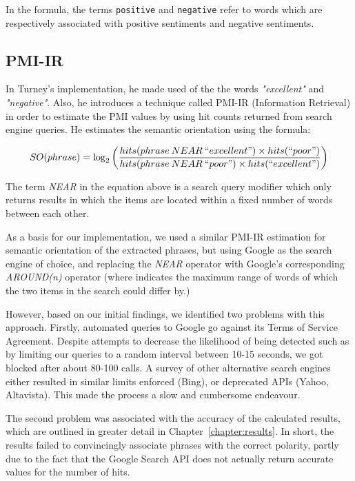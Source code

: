 \documentclass[11pt]{report} %
\begin{document}
In the formula, the terms \verb|positive| and \verb|negative| refer to words which are respectively associated with positive sentiments and negative sentiments. 

\subsection{PMI-IR}
In Turney's implementation, he made used of the the words \textit{"excellent"} and \textit{"negative"}. Also, he introduces a technique called PMI-IR (Information Retrieval) in order to estimate the PMI values by using hit counts returned from search engine queries. He estimates the semantic orientation using the formula:

\begin{equation*} SO(phrase) = \log_2 \left(\frac{hits(phrase \: NEAR \: ``excellent") \times hits(``poor") }{hits(phrase \: NEAR \: ``poor") \times hits(``excellent") }\right) \end{equation*}

The term \textit{NEAR} in the equation above is a search query modifier which only returns results in which the items are located within a fixed number of words between each other. 

As a basis for our implementation, we used a similar PMI-IR estimation for semantic orientation of the extracted phrases, but using Google as the search engine of choice, and replacing the \textit{NEAR} operator with Google's corresponding \textit{AROUND(n)} operator (where  indicates the maximum range of words of which the two items in the search could differ by.)

However, based on our initial findings, we identified two problems with this approach. Firstly, automated queries to Google go against its Terms of Service Agreement. Despite attempts to decrease the likelihood of being detected such as by limiting our queries to a random interval between 10-15 seconds, we got blocked after about 80-100 calls. A survey of other alternative search engines either resulted in similar limits enforced (Bing), or deprecated APIs (Yahoo, Altavista). This made the process a slow and cumbersome endeavour.

The second problem was associated with the accuracy of the calculated results, which are outlined in greater detail in Chapter~\ref{chapter:results}. In short, the results failed to convincingly associate phrases with the correct polarity, partly due to the fact that the Google Search API does not actually return accurate values for the number of hits.
\end{document}

